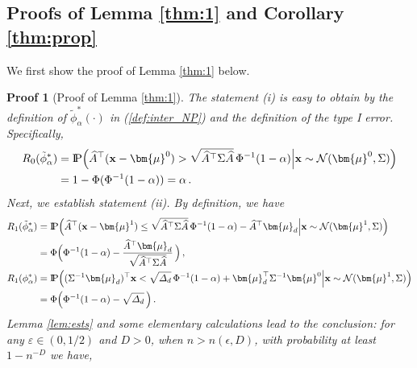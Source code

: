 \documentclass[12pt]{article}
\numberwithin{equation}{section}
\newtheorem{myPro}{Proof}
\theoremstyle{remark}
\newcommand{\p}{{\rm I}\kern-0.18em{\rm P}}
\newcommand{\1}{{\rm 1}\kern-0.24em{\rm I}}
\begin{document}
\begin{appendices}


\section{Proofs of Lemma \ref{thm:1} and Corollary \ref{thm:prop} } \label{sec:appen_main-results}
We first show the proof of Lemma \ref{thm:1} below.
\begin{myPro}[Proof of Lemma \ref{thm:1}]
The statement (i) is easy to obtain by the definition of $\tilde \phi_\alpha^*(\cdot)$ in (\ref{def:inter_NP}) and the definition of the type I error. Specifically, 
\begin{align*}
R_0(\tilde \phi_\alpha^*) &= \p \Big(\widehat A^{\top} ({\bf x} -{\bm{\mu}}^0) > \sqrt{\widehat A^{\top} \Sigma \widehat A}\, \Phi^{-1}(1-\alpha) \Big| {\bf x}\sim \mathcal{N}({\bm{\mu}}^0, \Sigma) \Big)\notag\\
& = 1- \Phi(\Phi^{-1}(1-\alpha)) = \alpha\,.
\end{align*}
Next, we establish statement (ii). By definition, we have
\begin{align}
R_1(\tilde \phi_\alpha^*) &=\p \Big(\widehat A^{\top} ({\bf x} -{\bm{\mu}}^1) \leq \sqrt{\widehat A^{\top} \Sigma \widehat A}\, \Phi^{-1}(1-\alpha)  - \widehat A^{\top} {\bm{\mu}}_d\Big| {\bf x}\sim \mathcal{N}({\bm{\mu}}^1, \Sigma) \Big)\notag\\
&= \Phi\Big( \Phi^{-1}(1-\alpha)   - \frac{\widehat A^{\top} {\bm{\mu}}_d}{\sqrt{\widehat A^{\top} \Sigma \widehat A}}\, \Big)\,, \notag\\
R_1({\phi}_\alpha^*) &=\p \Big((\Sigma^{-1}{\bm{\mu}}_d)^{\top}{\bf x}< \sqrt{\varDelta_d} \, \Phi^{-1}(1-\alpha) + {\bm{\mu}}_d^{\top} \Sigma^{-1} {\bm{\mu}}^0 \Big|{\bf x}\sim \mathcal{N}({\bm{\mu}}^1, \Sigma)\Big) \notag\\
&= \Phi\Big(\Phi^{-1}(1-\alpha) - \sqrt{\varDelta_d} \, \Big)\,. \label{21102901}
\end{align}
Lemma \ref{lem:ests} and some elementary calculations lead to the conclusion:  for any $\varepsilon \in (0,1/2)$ and $D>0$, when $n> n(\epsilon, D)$,  with probability at least $1- n^{-D}$ we have,

\end{myPro}
\end{appendices}
\end{document}
